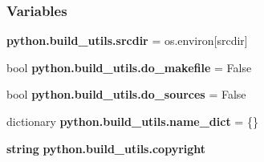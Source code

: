 \subsubsection*{Variables}
\begin{DoxyCompactItemize}
\item 
{\bf python.\+build\+\_\+utils.\+srcdir} = os.\+environ[\textquotesingle{}srcdir\textquotesingle{}]
\item 
bool {\bf python.\+build\+\_\+utils.\+do\+\_\+makefile} = False
\item 
bool {\bf python.\+build\+\_\+utils.\+do\+\_\+sources} = False
\item 
dictionary {\bf python.\+build\+\_\+utils.\+name\+\_\+dict} = \{\}
\item 
{\bf string} {\bf python.\+build\+\_\+utils.\+copyright}
\end{DoxyCompactItemize}
